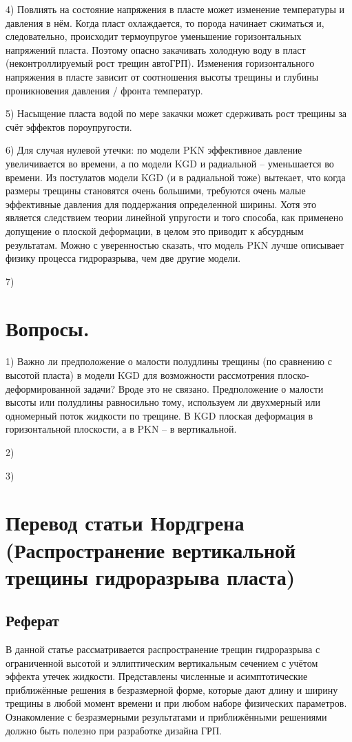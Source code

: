 \documentclass[a4paper, 11pt]{article}
\begin{document}
4) Повлиять на состояние напряжения в пласте может изменение температуры и давления в нём.
Когда пласт охлаждается, то порода начинает сжиматься и, следовательно, происходит термоупругое уменьшение горизонтальных напряжений пласта.
Поэтому опасно закачивать холодную воду в пласт (неконтроллируемый рост трещин автоГРП).
Изменения горизонтального напряжения в пласте зависит от соотношения высоты трещины и глубины проникновения давления / фронта температур.

5) Насыщение пласта водой по мере закачки может сдерживать рост трещины за счёт эффектов пороупругости.

6) Для случая нулевой утечки: по модели PKN эффективное давление увеличивается во времени, а по модели KGD и радиальной -- уменьшается во времени.
Из постулатов модели KGD (и в радиальной тоже) вытекает, что когда размеры трещины становятся очень большими, требуются очень малые эффективные давления для поддержания определенной ширины.
Хотя это является следствием теории линейной упругости и того способа, как применено допущение о плоской деформации, в целом это приводит к абсурдным результатам.
Можно с уверенностью сказать, что модель PKN лучше описывает физику процесса гидроразрыва, чем две другие модели.

7)
\\

\section{Вопросы.}

1) Важно ли предположение о малости полудлины трещины (по сравнению с высотой пласта) в модели KGD для возможности рассмотрения плоско-деформированной задачи?
Вроде это не связано.
Предположение о малости высоты или полудлины равносильно тому, используем ли двухмерный или одномерный поток жидкости по трещине.
В KGD плоская деформация в горизонтальной плоскости, а в PKN -- в вертикальной.

2) 

3)

\newpage
\section{Перевод статьи Нордгрена (Распространение вертикальной трещины гидроразрыва пласта)}

\subsection{Реферат}
В данной статье рассматривается распространение трещин гидроразрыва с ограниченной высотой и эллиптическим вертикальным сечением с учётом эффекта утечек жидкости.
Представлены численные и асимптотические приближённые решения в безразмерной форме, которые дают длину и ширину трещины в любой момент времени и при любом наборе физических параметров.
Ознакомление с безразмерными результатами и приближёнными решениями должно быть полезно при разработке дизайна ГРП.
\end{document}
